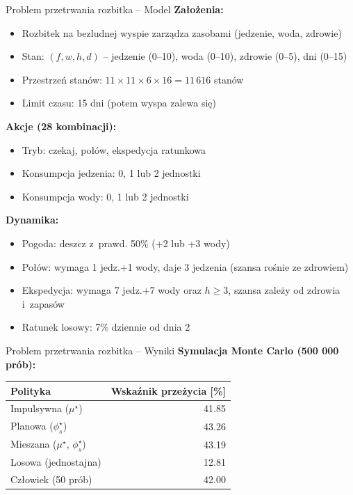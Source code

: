 \documentclass[aspectratio=169]{beamer}
\begin{document}
\begin{frame}{Problem przetrwania rozbitka -- Model}
\textbf{Założenia:}
\begin{itemize}
    \item Rozbitek na bezludnej wyspie zarządza zasobami (jedzenie, woda, zdrowie)
    \item Stan: $(f, w, h, d)$ -- jedzenie (0--10), woda (0--10), zdrowie (0--5), dni (0--15)
    \item Przestrzeń stanów: $11 \times 11 \times 6 \times 16 = 11\,616$ stanów
    \item Limit czasu: 15 dni (potem wyspa zalewa się)
\end{itemize}

\vspace{0.3em}
\textbf{Akcje (28 kombinacji):}
\begin{itemize}
    \item Tryb: czekaj, połów, ekspedycja ratunkowa
    \item Konsumpcja jedzenia: 0, 1 lub 2 jednostki
    \item Konsumpcja wody: 0, 1 lub 2 jednostki
\end{itemize}

\vspace{0.3em}
\textbf{Dynamika:}
\begin{itemize}
    \item Pogoda: deszcz z~prawd. 50\% (+2 lub +3 wody)
    \item Połów: wymaga 1 jedz.+1 wody, daje 3 jedzenia (szansa rośnie ze zdrowiem)
    \item Ekspedycja: wymaga 7 jedz.+7 wody oraz $h \geq 3$, szansa zależy od zdrowia i~zapasów
    \item Ratunek losowy: 7\% dziennie od dnia 2
\end{itemize}
\end{frame}

\begin{frame}{Problem przetrwania rozbitka -- Wyniki}
\textbf{Symulacja Monte Carlo (500 000 prób):}

\begin{table}[h!]
\centering
\begin{tabular}{lr}
\toprule
\textbf{Polityka} & \textbf{Wskaźnik przeżycia [\%]} \\
\midrule
Impulsywna ($\mu^\star$) & 41.85 \\
Planowa ($\phi_s^\star$) & 43.26 \\
Mieszana ($\mu^\star$, $\phi_s^\star$) & 43.19 \\
Losowa (jednostajna) & 12.81 \\
Człowiek (50 prób) & 42.00 \\
\bottomrule
\end{tabular}
\end{table}

\end{frame}
\end{document}
